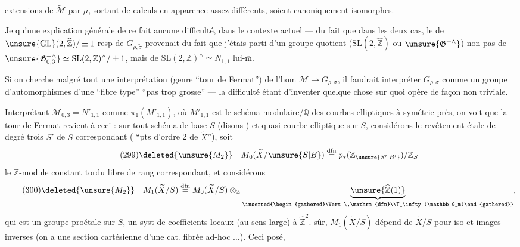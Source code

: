 
extensions de $\widetilde{\mathcal M}$ par $\mu$, sortant de calculs en apparence assez différents, soient canoniquement isomorphes.

Je  qu'une explication générale de ce fait  aucune difficulté, dans le contexte actuel --- du fait que dans les deux cas, le  de $\unsure{\mathrm{GL}}(2,\widehat{\mathbb Z})/\pm1$ resp de $G_{\rho,\widetilde\sigma}$ provenait du fait que j'étais parti d'un groupe quotient ($\mathrm{SL}(2,\widehat{\mathbb Z})$ ou $\unsure{\mathfrak G^{+\wedge}}$) \uline{non pas} de $\unsure{\mathfrak G_{0,3}^{+\wedge}}\simeq\mathrm{SL}(2,\mathbb Z)^\wedge/\pm1$, mais de $\mathrm{SL}(2,\mathbb Z)^\wedge\simeq N_{1,1}$ lui-$\overline{\mathrm m}$.

Si on cherche malgré tout une interprétation (genre ``tour de Fermat'') de l'hom $\mathcal M\to G_{\rho,\sigma}$, il faudrait interpréter $G_{\rho,\sigma}$  comme un groupe d'automorphismes d'une ``fibre type'' ``pas trop grosse'' --- la difficulté étant d'inventer quelque chose sur quoi  opère de façon non triviale.


Interprétant $\mathcal M_{0,3}=N'_{1,1}$ comme $\pi_1(M'_{1,1})$, où $M'_{1,1}$ est le schéma modulaire/$\mathbb Q$ des courbes elliptiques à symétrie près, on voit que la tour de Fermat revient à ceci : sur tout schéma de base $S$ (disons ) et  quasi-courbe elliptique  sur $S$, considérons le revêtement étale de degré trois $S'$ de $S$ correspondant ( ``pts d'ordre 2 de $\widetilde X$''),  soit
\[
\tag{299}
\deleted{\unsure{M_2}}\quad M_0(\widetilde X/\unsure{S|B})\overset{\mathrm{dfn}}{=}p_*(\mathbb Z_{\unsure{S'|B'}})/\mathbb Z_S
\]
le $\mathbb Z$-module constant tordu libre de rang  correspondant, et considérons
\[
\tag{300}
\deleted{\unsure{M_2}}\quad M_1(\widetilde X/S)\overset{\mathrm{dfn}}{=}M_0(\widetilde X/S)\otimes_{\mathbb Z}\underbrace{\unsure{\widehat{\mathbb Z}(1)}}_{\inserted{\begin{gathered}\Vert\,\mathrm{dfn}\\T_\infty(\mathbb G_m)\end{gathered}}},
\]
qui est un groupe proétale sur $S$, un syst de coefficients locaux\unsure{;} (au sens large) à $\widehat{\mathbb Z}^{2}$.  sûr, $M_1(\widetilde X/S)$ dépend  de $\widetilde X/S$ pour iso et images inverses (on a une section cartésienne d'une cat. fibrée ad-hoc $\ldots$). Ceci posé,

